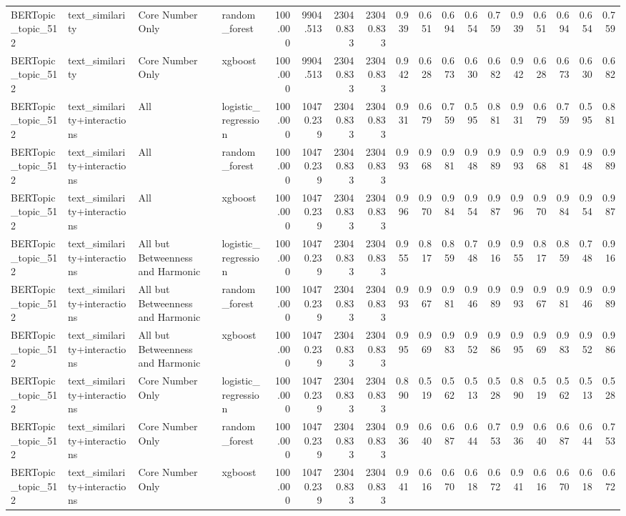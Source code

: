 \begin{tabular}{llllrrrrrrrrrrrrrr}
BERTopic_topic_512 & text_similarity & Core Number Only & random_forest & 100.000 & 9904.513 & 23040.833 & 23040.833 & 0.939 & 0.651 & 0.694 & 0.654 & 0.759 & 0.939 & 0.651 & 0.694 & 0.654 & 0.759 \\
BERTopic_topic_512 & text_similarity & Core Number Only & xgboost & 100.000 & 9904.513 & 23040.833 & 23040.833 & 0.942 & 0.628 & 0.673 & 0.630 & 0.682 & 0.942 & 0.628 & 0.673 & 0.630 & 0.682 \\
BERTopic_topic_512 & text_similarity+interactions & All & logistic_regression & 100.000 & 10470.239 & 23040.833 & 23040.833 & 0.931 & 0.679 & 0.759 & 0.595 & 0.881 & 0.931 & 0.679 & 0.759 & 0.595 & 0.881 \\
BERTopic_topic_512 & text_similarity+interactions & All & random_forest & 100.000 & 10470.239 & 23040.833 & 23040.833 & 0.993 & 0.968 & 0.981 & 0.948 & 0.989 & 0.993 & 0.968 & 0.981 & 0.948 & 0.989 \\
BERTopic_topic_512 & text_similarity+interactions & All & xgboost & 100.000 & 10470.239 & 23040.833 & 23040.833 & 0.996 & 0.970 & 0.984 & 0.954 & 0.987 & 0.996 & 0.970 & 0.984 & 0.954 & 0.987 \\
BERTopic_topic_512 & text_similarity+interactions & All but Betweenness and Harmonic & logistic_regression & 100.000 & 10470.239 & 23040.833 & 23040.833 & 0.955 & 0.817 & 0.859 & 0.748 & 0.916 & 0.955 & 0.817 & 0.859 & 0.748 & 0.916 \\
BERTopic_topic_512 & text_similarity+interactions & All but Betweenness and Harmonic & random_forest & 100.000 & 10470.239 & 23040.833 & 23040.833 & 0.993 & 0.967 & 0.981 & 0.946 & 0.989 & 0.993 & 0.967 & 0.981 & 0.946 & 0.989 \\
BERTopic_topic_512 & text_similarity+interactions & All but Betweenness and Harmonic & xgboost & 100.000 & 10470.239 & 23040.833 & 23040.833 & 0.995 & 0.969 & 0.983 & 0.952 & 0.986 & 0.995 & 0.969 & 0.983 & 0.952 & 0.986 \\
BERTopic_topic_512 & text_similarity+interactions & Core Number Only & logistic_regression & 100.000 & 10470.239 & 23040.833 & 23040.833 & 0.890 & 0.519 & 0.562 & 0.513 & 0.528 & 0.890 & 0.519 & 0.562 & 0.513 & 0.528 \\
BERTopic_topic_512 & text_similarity+interactions & Core Number Only & random_forest & 100.000 & 10470.239 & 23040.833 & 23040.833 & 0.936 & 0.640 & 0.687 & 0.644 & 0.753 & 0.936 & 0.640 & 0.687 & 0.644 & 0.753 \\
BERTopic_topic_512 & text_similarity+interactions & Core Number Only & xgboost & 100.000 & 10470.239 & 23040.833 & 23040.833 & 0.941 & 0.616 & 0.670 & 0.618 & 0.672 & 0.941 & 0.616 & 0.670 & 0.618 & 0.672 \\
\bottomrule
\end{tabular}
